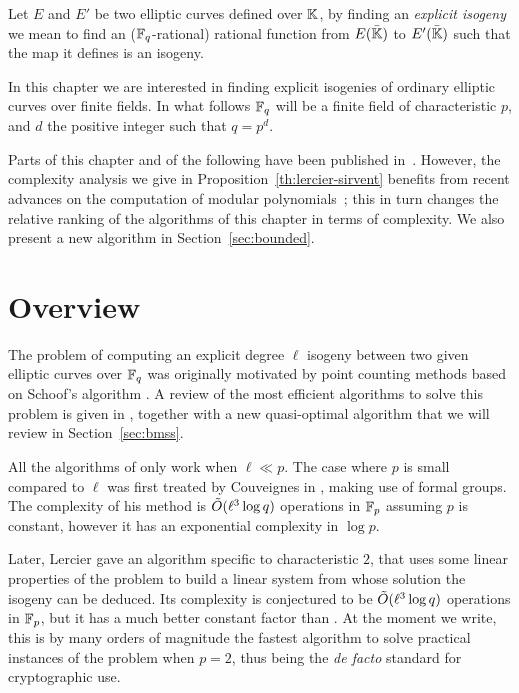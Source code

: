 Let $E$ and $E'$ be two elliptic curves defined over $\mathbb{K}$, by finding
an \emph{explicit isogeny} we mean to find an ($\mathbb{F}_q$-rational)
rational function from $E(\bar{\mathbb{K}})$ to $E'(\bar{\mathbb{K}})$ such that the
map it defines is an isogeny. 

In this chapter we are interested in finding explicit isogenies of
ordinary elliptic curves over finite fields. In what follows $\mathbb{F}_q$
will be a finite field of characteristic $p$, and $d$ the positive
integer such that $q=p^d$.

Parts of this chapter and of the following have been published
in~\cite{df10}. However, the complexity analysis we give in
Proposition~\ref{th:lercier-sirvent} benefits from recent advances on
the computation of modular polynomials~\cite{sutherland10:modpol};
this in turn changes the relative ranking of the algorithms of this
chapter in terms of complexity. We also present a new algorithm in
Section~\ref{sec:bounded}.


\section{Overview}
\label{sec:history}

The problem of computing an explicit degree $\ell$ isogeny between two
given elliptic curves over $\mathbb{F}_q$ was originally motivated by point
counting methods based on Schoof's algorithm
\cite{atkin88,elkies98,schoof95}. A review of the most
efficient algorithms to solve this problem is given in
\cite{bostan+morain+salvy+schost08}, together with a new quasi-optimal
algorithm that we will review in Section~\ref{sec:bmss}.

All the algorithms of \cite{bostan+morain+salvy+schost08} only work
when $\ell\ll p$. The case where $p$ is small compared to $\ell$ was
first treated by Couveignes in \cite{couveignes94}, making use of
formal groups. The complexity of his method is $\tilde{O}(\ell^3\log q)$ operations in
$\mathbb{F}_p$ assuming $p$ is constant, however it has an exponential
complexity in $\log p$.

Later, Lercier \cite{lercier96} gave an algorithm specific to
characteristic $2$, that uses some linear properties of the problem to
build a linear system from whose solution the isogeny can be deduced.
Its complexity is conjectured to be $\tilde{O}(\ell^3\log q)$ operations
in $\mathbb{F}_p$, but it has a much better constant factor than
\cite{couveignes94}. At the moment we write, this is by many orders of
magnitude the fastest algorithm to solve practical instances of the
problem when $p=2$, thus being the \emph{de facto} standard for
cryptographic use.

